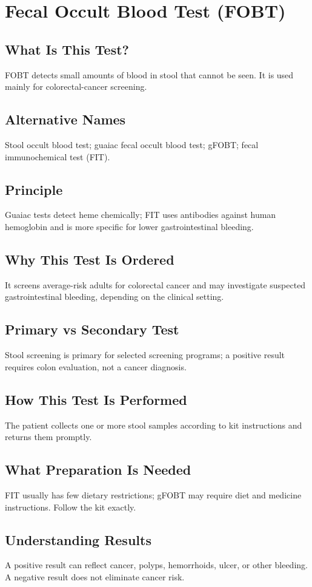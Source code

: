 \chapter{Fecal Occult Blood Test (FOBT)}
\section*{What Is This Test?} FOBT detects small amounts of blood in stool that cannot be seen. It is used mainly for colorectal-cancer screening.
\section*{Alternative Names} Stool occult blood test; guaiac fecal occult blood test; gFOBT; fecal immunochemical test (FIT).
\section*{Principle} Guaiac tests detect heme chemically; FIT uses antibodies against human hemoglobin and is more specific for lower gastrointestinal bleeding.
\section*{Why This Test Is Ordered} It screens average-risk adults for colorectal cancer and may investigate suspected gastrointestinal bleeding, depending on the clinical setting.
\section*{Primary vs Secondary Test} Stool screening is primary for selected screening programs; a positive result requires colon evaluation, not a cancer diagnosis.
\section*{How This Test Is Performed} The patient collects one or more stool samples according to kit instructions and returns them promptly.
\section*{What Preparation Is Needed} FIT usually has few dietary restrictions; gFOBT may require diet and medicine instructions. Follow the kit exactly.
\section*{Understanding Results} A positive result can reflect cancer, polyps, hemorrhoids, ulcer, or other bleeding. A negative result does not eliminate cancer risk.
